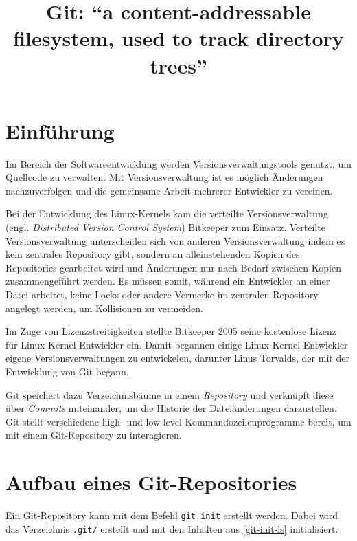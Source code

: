 \documentclass[
	nonacm,%
	screen,%
	sigplan,
]{acmart}
\title[Git]{%
	Git: \enquote{a content-addressable filesystem, used to track directory trees}%
	\texorpdfstring{ \cite{track-directory-trees}}{}%
}
\affiliation{%
	\institution{Technische Universität Dresden}
	\city{Dresden}
	\country{Germany}%
}
\begin{document}
\maketitle

\tableofcontents

\section{Einführung}

Im Bereich der Softwareentwicklung werden Versionsverwaltungstools genutzt, um Quellcode zu verwalten. Mit Versionsverwaltung ist es möglich Änderungen nachzuverfolgen und die gemeinsame Arbeit mehrerer Entwickler zu vereinen.

Bei der Entwicklung des Linux-Kernels kam die verteilte Versionsverwaltung (engl. \emph{Distributed Version Control System}) Bitkeeper zum Einsatz. Verteilte Versionsverwaltung unterscheiden sich von anderen Versionsverwaltung indem es kein zentrales Repository gibt, sondern an alleinstehenden Kopien des Repositories gearbeitet wird und Änderungen nur nach Bedarf zwischen Kopien zusammengeführt werden. Es müssen somit, während ein Entwickler an einer Datei arbeitet, keine Locks oder andere Vermerke \cite{cvs-reserved-checkout} im zentralen Repository angelegt werden, um Kollisionen zu vermeiden.%

Im Zuge von Lizenzstreitigkeiten stellte Bitkeeper 2005 seine kostenlose Lizenz für  Linux-Kernel-Entwickler ein. \cite{bitkeeper} Damit begannen einige  Linux-Kernel-Entwickler eigene Versionsverwaltungen zu entwickelen, darunter Linus Torvalds, der mit der  Entwicklung von Git begann.%

Git speichert dazu Verzeichnisbäume in einem \emph{Repository} und verknüpft diese über  \emph{Commits} miteinander, um die Historie der Dateiänderungen darzustellen. Git stellt  verschiedene high- und low-level \cite{plumbing} Kommandozeilenprogramme bereit, um mit einem Git-Repository zu interagieren.

\section{Aufbau eines Git-Repositories}

Ein Git-Repository kann mit dem Befehl \texttt{git init} erstellt werden. Dabei wird das Verzeichnis \texttt{.git/} erstellt und mit den Inhalten aus \autoref{git-init-ls} initialisiert.
\end{document}
